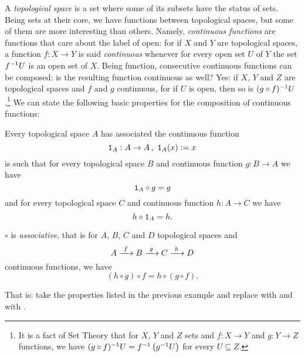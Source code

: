\begin{example}[Topology]
A {\em topological space} is a set where some of its subsets have the status of  sets. Being sets at their core, we have functions between topological spaces, but some of them are more interesting than others. Namely, {\em continuous functions} are functions that care about the label of open: for if \(X\) and \(Y\) are topological spaces, a function \(f : X \to Y\) is said {\em continuous} whenever for every open set \(U\) of \(Y\) the set \(f^{-1} U\) is an open set of \(X\). Being function, consecutive continuous functions can be composed: is the resulting function continuous as well? Yes: if \(X\), \(Y\) and \(Z\) are topological spaces and \(f\) and \(g\) continuous, for if \(U\) is open, then so is \((g \circ f)^{-1}U\).\footnote{It is a fact of Set Theory that for \(X\), \(Y\) and \(Z\) sets and \(f : X \to Y\) and \(g : Y \to Z\) functions, we have \((g \circ f)^{-1}U = f^{-1} \left(g^{-1} U\right)\) for every \(U \subseteq Z\).} We can state the following basic properties for the composition of continuous functions:
\begin{tcbenum}
\item Every topological space \(A\) has associated the continuous function
\[\mathtt 1_A : A \to A \,,\ \mathtt 1_A (x) := x\]
is such that for every topological space \(B\) and continuous function \(g : B \to A\) we have
\[\mathtt 1_A \circ g = g\]
and for every topological space \(C\) and continuous function \(h : A \to C\) we have
\[h \circ \mathtt 1_A = h .\]
\item \(\circ\) is {\em associative}, that is for \(A\), \(B\), \(C\) and \(D\) topological spaces and
\[A \xrightarrow{\ f\ } B \xrightarrow{\ g\ } C \xrightarrow{\ h\ } D\]
continuous functions, we have
\[(h \circ g) \circ f = h \circ (g \circ f) .\]
\end{tcbenum} 
That is: take the properties listed in the previous example and replace  with  and  with .
\end{example}

